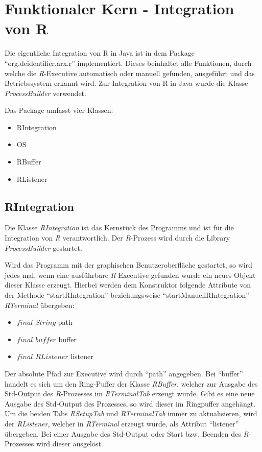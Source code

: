 \documentclass[a4paper, 12pt]{report} %
\begin{document}
\section{Funktionaler Kern - Integration von R} \label{funktionaler Kern}

Die eigentliche Integration von R in Java ist in dem Package "`org.deidentifier.arx.r"' implementiert. Dieses beinhaltet alle Funktionen, durch welche die \textit{R}-Executive automatisch oder manuell gefunden, ausgeführt und das Betriebssystem erkannt wird. Zur Integration von R in Java wurde die Klasse \textit{ProcessBuilder} verwendet.

\begin{samepage}
Das Package umfasst vier Klassen:
\begin{itemize}
	\item RIntegration
	\item OS
	\item RBuffer
	\item RListener
\end{itemize}
\end{samepage}


\subsection{RIntegration} \label{RIntegration}

Die Klasse \textit{RIntegration} ist das Kernstück des Programms und ist für die Integration von \textit{R} verantwortlich. Der \textit{R}-Prozess wird durch die Library \textit{ProcessBuilder} gestartet.

Wird das Programm mit der graphischen Benutzeroberfläche gestartet, so wird jedes mal, wenn eine ausführbare \textit{R}-Executive gefunden wurde ein neues Objekt dieser Klasse erzeugt.
Hierbei werden dem Konstruktor folgende Attribute von der Methode "`startRIntegration"' beziehungsweise "`startManuellRIntegration"' \textit{RTerminal} übergeben:
\begin{itemize}
	\item $final$ $String$ path
	\item $final$ $buffer$ buffer 
	\item $final$ $RListener$ listener
\end{itemize}
%
Der absolute Pfad zur Executive wird durch "`path"' angegeben. Bei "`buffer"' handelt es sich um den Ring-Puffer der Klasse \textit{RBuffer}, welcher zur Ausgabe des Std-Output des \textit{R}-Prozesses im \textit{RTerminalTab} erzeugt wurde. Gibt es eine neue Ausgabe des Std-Output des Prozesses, so wird dieser im Ringpuffer angehängt. 
Um die beiden Tabs \textit{RSetupTab} und \textit{RTerminalTab} immer zu aktualisieren, wird der \textit{RListener}, welcher in \textit{RTerminal} erzeugt wurde, als Attribut "`listener"' übergeben.
Bei einer Ausgabe des Std-Output oder Start bzw. Beenden des \textit{R}-Prozesses wird dieser ausgelöst.\\
\end{document}

